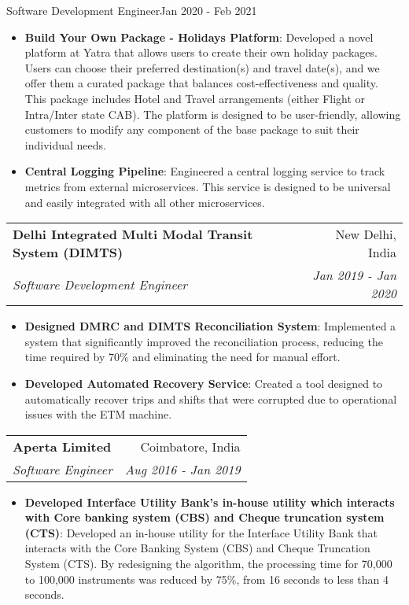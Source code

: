 \documentclass[a4paper,20pt]{article}
\makeatletter
\newcommand{\resumeItem}[2]{
  \item\small{
    \textbf{#1}{: #2 \vspace{-2pt}}
  }
}
\newcommand{\resumeSubheading}[4]{
  \vspace{-1pt}\item
    \begin{tabular*}{0.97\textwidth}{l@{\extracolsep{\fill}}r}
      \textbf{#1} & #2 \\
      \textit{#3} & \textit{#4} \\
    \end{tabular*}\vspace{-5pt}
}
\newcommand{\resumeItemListStart}{\begin{itemize}}
\newcommand{\resumeItemListEnd}{\end{itemize}\vspace{-5pt}}
\makeatother
\begin{document}
    {Software Development Engineer}{Jan 2020 - Feb 2021}
    \resumeItemListStart
          \resumeItem{Build Your Own Package - Holidays Platform}{Developed a novel platform at Yatra that allows users to create their own holiday packages. Users can choose their preferred destination(s) and travel date(s), and we offer them a curated package that balances cost-effectiveness and quality. This package includes Hotel and Travel arrangements (either Flight or Intra/Inter state CAB). The platform is designed to be user-friendly, allowing customers to modify any component of the base package to suit their individual needs. }
          \resumeItem{Central Logging Pipeline}{Engineered a central logging service to track metrics from external microservices. This service is designed to be universal and easily integrated with all other microservices.}
          \newline
      \resumeItemListEnd
\vspace{2pt}
    \resumeSubheading
		{Delhi Integrated Multi Modal Transit System (DIMTS)}{New Delhi, India}
		{Software Development Engineer}{Jan 2019 - Jan 2020}
		\resumeItemListStart
        \resumeItem{Designed DMRC and DIMTS Reconciliation System}
          { Implemented a system that significantly improved the reconciliation process, reducing the time required by 70\% and eliminating the need for manual effort.}
        \resumeItem{Developed Automated Recovery Service}
          {Created a tool designed to automatically recover trips and shifts that were corrupted due to operational issues with the ETM machine.}
        \vspace{0pt}
        \newline
		\resumeItemListEnd
\vspace{2pt}
    \resumeSubheading{Aperta Limited}{Coimbatore, India}
    {Software Engineer}{Aug 2016 - Jan 2019}
    \resumeItemListStart
          \resumeItem{Developed Interface Utility Bank’s in-house utility which interacts with Core banking system (CBS) and Cheque truncation system (CTS)}{Developed an in-house utility for the Interface Utility Bank that interacts with the Core Banking System (CBS) and Cheque Truncation System (CTS). By redesigning the algorithm, the processing time for 70,000 to 100,000 instruments was reduced by 75\%, from 16 seconds to less than 4 seconds.}
          \newline
      \resumeItemListEnd
\end{document}
